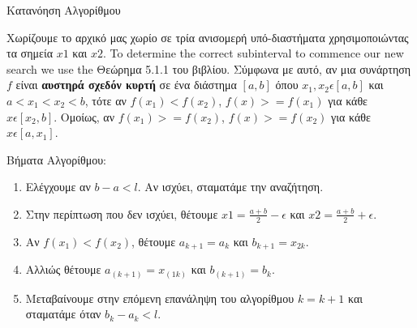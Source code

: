 Κατανόηση Αλγορίθμου

Χωρίζουμε το αρχικό μας χωρίο σε τρία ανισομερή υπό-διαστήματα χρησιμοποιώντας τα σημεία $x1$ και $x2$.
To determine the correct subinterval to commence our new search we use the Θεώρημα 5.1.1 του βιβλίου.
Σύμφωνα με αυτό, αν μια συνάρτηση $f$ είναι \textbf{αυστηρά σχεδόν κυρτή} σε ένα διάστημα $[a,b]$
όπου $x_1,x_2 \epsilon[a,b]$ και $a < x_1 < x_2 < b$, τότε αν $f(x_1)<f(x_2)$, $f(x)>=f(x_1)$ για κάθε
$x \epsilon [x_2,b]$. Ομοίως, αν $f(x_1)>=f(x_2)$, $f(x)>=f(x_2)$ για κάθε $x \epsilon [a,x_1]$.

Βήματα Αλγορίθμου:
\begin{enumerate}
    \item Ελέγχουμε αν $b - a < l$. Αν ισχύει, σταματάμε την αναζήτηση.
    \item Στην περίπτωση που δεν ισχύει, θέτουμε $x1=\frac{a+b}{2}-\epsilon$ και
    $x2=\frac{a+b}{2}+\epsilon$.
    \item Αν $f(x_1) < f(x_2)$, θέτουμε $a_{k+1}=a_k$ και $b_{k+1}=x_{2k}$.
    \item Αλλιώς θέτουμε $a_(k+1)=x_(1k)$ και $b_(k+1)=b_k$.
    \item Μεταβαίνουμε στην επόμενη επανάληψη του αλγορίθμου $k=k+1$ και σταματάμε όταν
    $b_k - a_k < l$.
\end{enumerate}